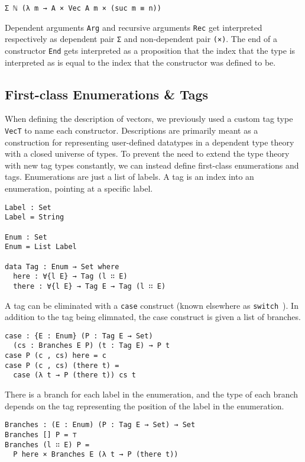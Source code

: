 \documentclass[preprint,nonatbib]{sigplanconf}
\begin{document}
\begin{verbatim}
Σ ℕ (λ m → A × Vec A m × (suc m ≡ n))
\end{verbatim}

Dependent arguments {\tt Arg} and recursive arguments
{\tt Rec} get interpreted respectively as dependent pair
{\tt Σ} and non-dependent pair {\tt (×)}. The end of a constructor
{\tt End} gets interpreted as a proposition that the index that the
type is interpreted as is equal to the index that the constructor was
defined to be.

\subsection{First-class Enumerations \& Tags}
\label{sec:background:case}

When defining the description of vectors, we previously used a custom
tag type {\tt VecT} to name each constructor. Descriptions are
primarily meant as a construction for representing user-defined
datatypes in a dependent type theory with a closed universe of types.
To prevent the need to extend the type theory with new tag types
constantly, we can instead define first-class enumerations and tags.
Enumerations are just a list of labels. A tag is an index into an
enumeration, pointing at a specific label.

\begin{verbatim}
Label : Set
Label = String

Enum : Set
Enum = List Label

data Tag : Enum → Set where
  here : ∀{l E} → Tag (l ∷ E)
  there : ∀{l E} → Tag E → Tag (l ∷ E)
\end{verbatim}

A tag can be eliminated with a {\tt case} construct (known elsewhere as
{\tt switch}~\citep{Chapman:2010:GAL:1932681.1863547,dagand:phd}).
In addition to the tag being elimnated, the case construct is given a
list of branches.

\begin{verbatim}
case : {E : Enum} (P : Tag E → Set)
  (cs : Branches E P) (t : Tag E) → P t
case P (c , cs) here = c
case P (c , cs) (there t) =
  case (λ t → P (there t)) cs t
\end{verbatim}

There is a branch for each label in the enumeration, and the type of
each branch depends on the tag representing the position of the label
in the enumeration.

\begin{verbatim}
Branches : (E : Enum) (P : Tag E → Set) → Set
Branches [] P = ⊤
Branches (l ∷ E) P =
  P here × Branches E (λ t → P (there t))
\end{verbatim}
\end{document}
